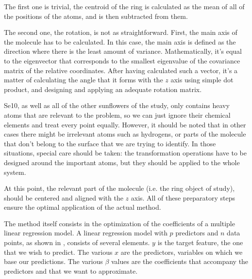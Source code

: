 The first one is trivial, the centroid of the ring is calculated as the mean of all of the positions of the atoms, and is then subtracted from them.

The second one, the rotation, is not as straightforward.
First, the main axis of the molecule has to be calculated.
In this case, the main axis is defined as the direction where there is the least amount of variance.
Mathematically, it's equal to the eigenvector that corresponds to the smallest eigenvalue of the covariance matrix of the relative coordinates.
After having calculated such a vector, it's a matter of calculating the angle that it forms with the $z$ axis using simple dot product, and designing and applying an adequate rotation matrix.

Se10, as well as all of the other sunflowers of the study, only contains heavy atoms that are relevant to the problem, so we can just ignore their chemical elements and treat every point equally.
However, it should be noted that in other cases there might be irrelevant atoms such as hydrogens, or parts of the molecule that don't belong to the surface that we are trying to identify.
In those situations, special care should be taken: the transformation operations have to be designed around the important atoms, but they should be applied to the whole system.

At this point, the relevant part of the molecule (i.e. the ring object of study), should be centered and aligned with the $z$ axis.
All of these preparatory steps ensure the optimal application of the actual method.

The method itself consists in the optimization of the coefficients of a multiple linear regression model.%
A linear regression model with $p$ predictors and $n$ data points, as shown in , consists of several elements.
$y$ is the target feature, the one that we wish to predict.
The various $x$ are the predictors, variables on which we base our predictions.
The various $\beta$ values are the coefficients that accompany the predictors and that we want to approximate.

